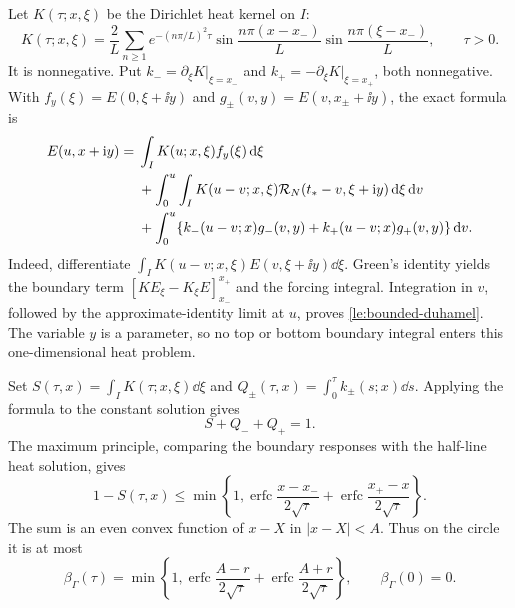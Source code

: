 Let $K(\tau;x,\xi)$ be the Dirichlet heat kernel on $I$:
\begin{equation}
 K(\tau;x,\xi)=\frac2L\sum_{n\ge1}e^{-(n\pi/L)^2\tau}
  \sin\frac{n\pi(x-x_-)}L\sin\frac{n\pi(\xi-x_-)}L,
 \qquad \tau>0.
 \label{le:kernel}
\end{equation}
It is nonnegative. Put
$k_-=\partial_\xi K|_{\xi=x_-}$ and
$k_+=-\partial_\xi K|_{\xi=x_+}$, both nonnegative. With
$f_y(\xi)=E(0,\xi+\ii y)$ and $g_\pm(v,y)=E(v,x_\pm+\ii y)$,
the exact formula is
\begin{align}
 E(u,x+\mathrm i y)={}&\int_I K(u;x,\xi)f_y(\xi)\,\mathrm d\xi\notag\\
 &+\int_0^u\int_I K(u-v;x,\xi)
             \mathcal R_N(t_*-v,\xi+\mathrm i y)\,\mathrm d\xi\,\mathrm d v\notag\\
 &+\int_0^u\{k_-(u-v;x)g_-(v,y)
                    +k_+(u-v;x)g_+(v,y)\}\,\mathrm d v.
 \label{le:bounded-duhamel}
\end{align}
Indeed, differentiate $\int_I K(u-v;x,\xi)E(v,\xi+\ii y)\dd\xi$.
Green's identity yields the boundary term
$[K E_\xi-K_\xi E]_{x_-}^{x_+}$ and the forcing integral. Integration
in $v$, followed by the approximate-identity limit at $u$, proves
\eqref{le:bounded-duhamel}. The variable $y$ is a parameter, so no top
or bottom boundary integral enters this one-dimensional heat problem.

Set $S(\tau,x)=\int_I K(\tau;x,\xi)\dd\xi$ and
$Q_\pm(\tau,x)=\int_0^\tau k_\pm(s;x)\dd s$. Applying the formula to
the constant solution gives
\begin{equation}
 S+Q_-+Q_+=1.
 \label{le:mass}
\end{equation}
The maximum principle, comparing the boundary responses with the
half-line heat solution, gives
\begin{equation}
 1-S(\tau,x)\le\min\left\{1,
 \operatorname{erfc}\frac{x-x_-}{2\sqrt\tau}
 +\operatorname{erfc}\frac{x_+-x}{2\sqrt\tau}\right\}.
 \label{le:boundary}
\end{equation}
The sum is an even convex function of $x-X$ in $|x-X|<A$.
Thus on the circle it is at most
\begin{equation}
 \beta_\Gamma(\tau)=\min\left\{1,
 \operatorname{erfc}\frac{A-r}{2\sqrt\tau}
 +\operatorname{erfc}\frac{A+r}{2\sqrt\tau}\right\},
 \qquad \beta_\Gamma(0)=0.
 \label{le:beta}
\end{equation}

